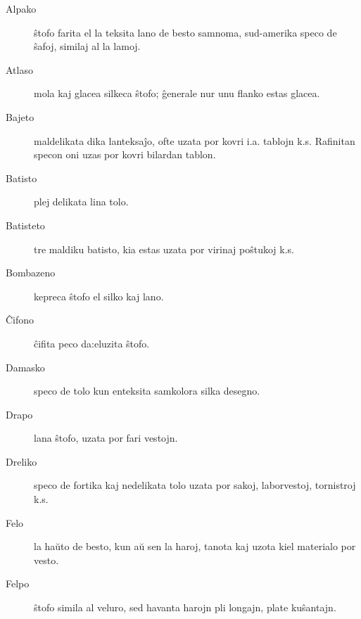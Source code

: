 \begin{description}
\item[Alpako]

 ŝtofo farita el la teksita lano de besto samnoma, sud-amerika speco de ŝafoj, similaj al la lamoj.

\item[Atlaso]

 mola kaj glacea silkeca ŝtofo; ĝenerale nur unu flanko estas glacea.

\item[\dagger\space Bajeto]

 maldelikata dika lanteksaĵo, ofte uzata por kovri i.a. tablojn k.s. Rafinitan specon oni uzas por kovri bilardan tablon.

\item[Batisto]

 plej delikata lina tolo.

\item[Batisteto]

 tre maldiku batisto, kia estas uzata por virinaj poŝtukoj k.s.

\item[Bombazeno]

 kepreca ŝtofo el silko kaj lano.

\item[Ĉifono]

 ĉifita peco da:eluzita ŝtofo.

\item[Damasko]

 speco de tolo kun enteksita samkolora silka desegno.

\item[Drapo]

 lana ŝtofo, uzata por fari vestojn.

\item[Dreliko]

 speco de fortika kaj nedelikata tolo uzata por sakoj, laborvestoj, tornistroj k.s.

\item[Felo]

 la haŭto de besto, kun aŭ sen la haroj, tanota kaj uzota kiel materialo por vesto.

\item[Felpo]

 ŝtofo simila al veluro, sed havanta harojn pli longajn, plate kuŝantajn.


\end{description}
